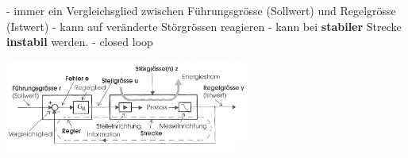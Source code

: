 \begin{description}[leftmargin=2.5cm]
\begin{minipage}{8cm}
 				 - immer ein Vergleichsglied zwischen Führungsgrösse (Sollwert) und
 				 Regelgrösse (Istwert) \newline
 				 - kann auf veränderte Störgrössen reagieren \newline
 				 - kann bei \textbf{stabiler} Strecke \textbf{instabil} werden. \newline
				 - closed loop
\end{minipage}
\begin{minipage}{8cm}
\includegraphics[width=8cm]{./bilder/Grundregelkreis_klein.jpg}
\end{minipage}				
				
\end{description}

